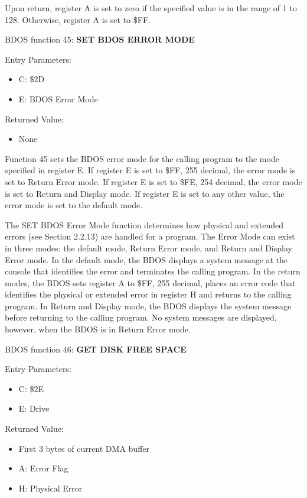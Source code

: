 Upon return, register A is set to zero if the specified value is in
the range of 1 to 128. Otherwise, register A is set to \$FF.

BDOS function 45: \textbf{SET BDOS ERROR MODE}

Entry Parameters:
\begin{itemize}
\item[] C: \$2D
\item[] E: BDOS Error Mode
\end{itemize}

Returned Value:
\begin{itemize}
\item[] None
\end{itemize}

Function 45 sets the BDOS error mode for the calling program to the
mode specified in register E. If register E is set to \$FF, 255
decimal, the error mode is set to Return Error mode. If register E is
set to \$FE, 254 decimal, the error mode is set to Return and Display
mode. If register E is set to any other value, the error mode is set
to the default mode.

The SET BDOS Error Mode function determines how physical and extended
errors (see Section 2.2.13) are handled for a program. The Error Mode
can exist in three modes: the default mode, Return Error mode, and
Return and Display Error mode.  In the default mode, the BDOS displays
a system message at the console that identifies the error and
terminates the calling program. In the return modes, the BDOS sets
register A to \$FF, 255 decimal, places an error code that identifies
the physical or extended error in register H and returns to the
calling program. In Return and Display mode, the BDOS displays the
system message before returning to the calling program. No system
messages are displayed, however, when the BDOS is in Return Error
mode.

BDOS function 46: \textbf{GET DISK FREE SPACE}

Entry Parameters:
\begin{itemize}
\item[] C: \$2E
\item[] E: Drive
\end{itemize}

Returned Value:
\begin{itemize}
\item[] First 3 bytes of current DMA buffer
\item[] A: Error Flag
\item[] H: Physical Error
\end{itemize}

